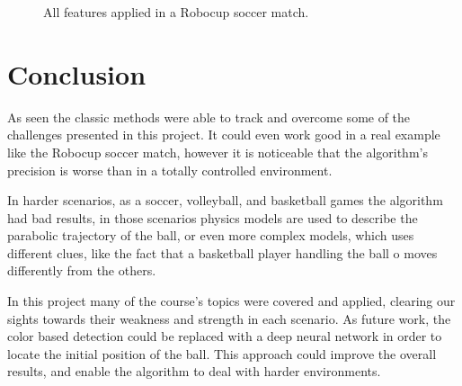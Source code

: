 \documentclass[10pt,twocolumn,letterpaper]{article}
\begin{document}
\begin{figure}[!h]
	\centering
	\setlength{\fboxsep}{1pt}
	\setlength{\fboxrule}{1pt}
	\caption{All features applied in a Robocup soccer match.}\label{fig:robocup2}
\end{figure}

\section{Conclusion}\label{sec:conclusion}

As seen the classic methods were able to track and overcome some of the
challenges presented in this project. It could even work good in a real example like the Robocup soccer match, however it is noticeable that the algorithm's precision is worse than in a totally controlled environment.

In harder scenarios, as a soccer, volleyball, and basketball games the algorithm had  bad results, in those scenarios physics models are used to describe the parabolic trajectory of the ball, or even  more complex models, which uses different clues, like the fact that a basketball player handling the ball o moves differently from the others.

In this project  many of the course's topics were covered and applied, clearing our sights towards their weakness and strength in each scenario. As future work, the color based detection could be replaced with a deep neural network in order to locate the initial position of the ball. This approach could improve the overall results, and enable the algorithm to deal with harder environments.

{\small


}
\end{document}
